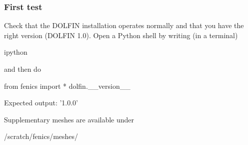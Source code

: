 \documentclass{fenicscourse}
\begin{document}
\begin{frame}[fragile]
\frametitle{First test}

Check that the DOLFIN installation operates normally and that you have
the right version (DOLFIN 1.0). Open a Python shell by writing (in a
terminal)
\vspace{-1em}
\begin{bash}
  ipython
\end{bash}
and then do
\vspace{-1em}
\begin{python}
  from fenics import *
  dolfin.__version__
\end{python}
Expected output: '1.0.0'

\bigskip

Supplementary meshes are available under
\vspace{-1em}
\begin{bash}
  /scratch/fenics/meshes/
\end{bash}



\end{frame}
\end{document}
